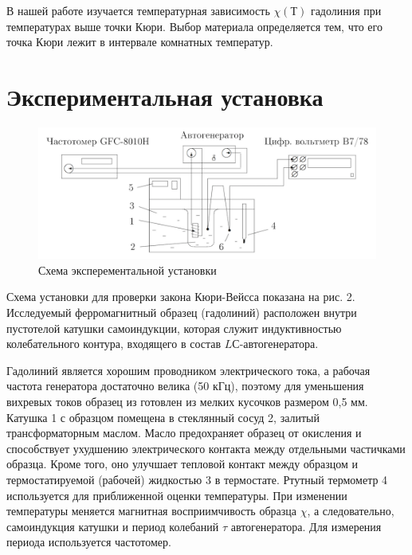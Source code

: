 \documentclass[12pt]{kiarticle}
\begin{document}
В нашей работе изучается температурная зависимость $ \chi(Т) $ гадолиния
при температурах выше точки Кюри. Выбор материала определяется
тем, что его точка Кюри лежит в интервале комнатных температур.

\section{Экспериментальная установка} 
\begin{figure}[h!]
	\centering
	\includegraphics[width=\linewidth]{pictures/342_stand}
	\caption{Схема эксперементальной установки}
	\label{fig:342stand}
\end{figure}

Схема установки для проверки закона Кюри-Вейсса показана на рис. 2. Исследуемый ферромагнитный образец (гадолиний) расположен внутри пустотелой катушки самоиндукции, которая служит индуктивностью колебательного контура, входящего в состав $ LС $-автогенератора. 

Гадолиний является хорошим проводником электрического тока, а рабочая
частота генератора достаточно велика (50 кГц), поэтому для уменьшения
вихревых токов образец из готовлен из мелких кусочков размером 0,5 мм.
Катушка 1 с образцом помещена в стеклянный сосуд 2, залитый трансформаторным маслом. Масло предохраняет образец от окисления и способствует ухудшению электрического контакта между отдельными частичками образца. Кроме того, оно улучшает тепловой контакт между образцом и термостатируемой (рабочей) жидкостью 3 в термостате. Ртутный термометр 4 используется для приближенной оценки температуры.
При изменении температуры меняется магнитная восприимчивость образца
$ \chi $, а следовательно, самоиндукция катушки и период колебаний $ \tau $ автогенератора. Для измерения периода используется частотомер.
\end{document}
